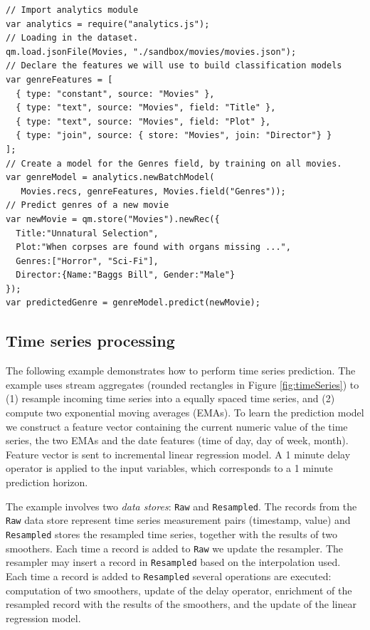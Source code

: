 \documentclass{article} %
\begin{document}
\begin{lstlisting}[caption={Text mining: storage, feature extraction and classification.}] 	
// Import analytics module
var analytics = require("analytics.js");
// Loading in the dataset.
qm.load.jsonFile(Movies, "./sandbox/movies/movies.json");
// Declare the features we will use to build classification models
var genreFeatures = [
  { type: "constant", source: "Movies" },
  { type: "text", source: "Movies", field: "Title" },
  { type: "text", source: "Movies", field: "Plot" },
  { type: "join", source: { store: "Movies", join: "Director"} }
];
// Create a model for the Genres field, by training on all movies.
var genreModel = analytics.newBatchModel(
   Movies.recs, genreFeatures, Movies.field("Genres"));
// Predict genres of a new movie
var newMovie = qm.store("Movies").newRec({
  Title:"Unnatural Selection",
  Plot:"When corpses are found with organs missing ...",
  Genres:["Horror", "Sci-Fi"],
  Director:{Name:"Baggs Bill", Gender:"Male"}
});
var predictedGenre = genreModel.predict(newMovie);
\end{lstlisting}

\subsection{Time series processing}

The following example demonstrates how to perform time series prediction. The example uses stream aggregates (rounded rectangles in Figure \ref{fig:timeSeries}) to (1) resample incoming time series into a equally spaced time series, and (2) compute two exponential moving averages (EMAs). To learn the prediction model we construct a feature vector containing the current numeric value of the time series, the two EMAs and the date features (time of day, day of week, month). Feature vector is sent to incremental linear regression model. A 1 minute delay operator is applied to the input variables, which corresponds to a 1 minute prediction horizon.

The example involves two \emph{data stores}: \texttt{Raw} and \texttt{Resampled}. The records from the \texttt{Raw} data store represent time series measurement pairs (timestamp, value) and \texttt{Resampled} stores the resampled time series, together with the results of two smoothers. Each time a record is added to \texttt{Raw} we update the resampler. The resampler may insert a record in
\texttt{Resampled} based on the interpolation used. Each time a record is added to \texttt{Resampled} several operations are executed: computation of two smoothers, update of the delay operator, enrichment of the resampled record with the results of the smoothers, and the update of the linear regression model.
\end{document}
